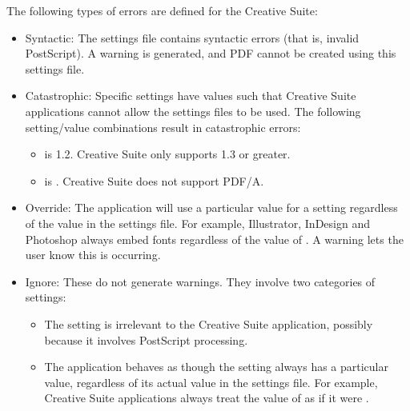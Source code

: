 \documentclass[letterpaper,12pt,english,openany,oneside]{sphinxmanual}
\begin{document}
The following types of errors are defined for the Creative Suite:
\begin{itemize}
\item {} 
Syntactic: The settings file contains syntactic errors (that is, invalid PostScript). A warning is generated, and PDF cannot be created using this settings file.

\item {} 
Catastrophic: Specific settings have values such that Creative Suite applications cannot allow the settings files to be used. The following setting/value combinations result in catastrophic errors:
\begin{itemize}
\item {} 
 is 1.2. Creative Suite only supports 1.3 or greater.

\item {} 
 is  . Creative Suite does not support PDF/A.

\end{itemize}

\item {} 
Override: The application will use a particular value for a setting regardless of the value in the settings file. For example, Illustrator, InDesign and Photoshop always embed fonts regardless of the value of  . A warning lets the user know this is occurring.

\item {} 
Ignore: These do not generate warnings. They involve two categories of settings:
\begin{itemize}
\item {} 
The setting is irrelevant to the Creative Suite application, possibly because it involves PostScript processing.

\item {} 
The application behaves as though the setting always has a particular value, regardless of its actual value in the settings file. For example, Creative Suite applications always treat the value of  as if it were  .

\end{itemize}

\end{itemize}
\end{document}
